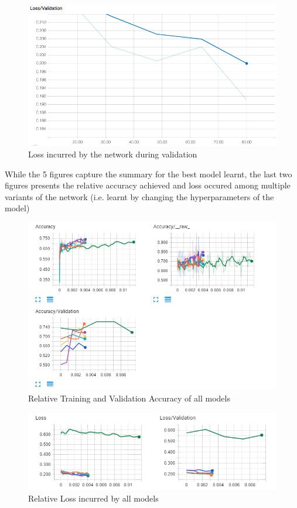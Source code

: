 \documentclass[journal]{IEEEtran}
\begin{document}
\begin{figure}[ht!]
    \centering
    \includegraphics[scale = 0.3]{Acc_76_5.png}
    \caption{Loss incurred by the network during validation}
    \label{fig:loss2}
\end{figure}
While the 5 figures capture the summary for the best model learnt, the last two figures presents the relative accuracy achieved and loss occured among multiple variants of the network (i.e. learnt by changing the hyperparameters of the model)
\begin{figure}[ht!]
    \centering
    \includegraphics[scale = 0.4]{rel_all_acc.PNG}
    \caption{Relative Training and Validation Accuracy of all models}
    \label{fig:rel_acc}
\end{figure}

\begin{figure}[ht!]
    \centering
    \includegraphics[scale = 0.45]{rel_all_loss.PNG}
    \caption{Relative Loss incurred by all models}
    \label{fig:rel_loss}
\end{figure}
\end{document}
